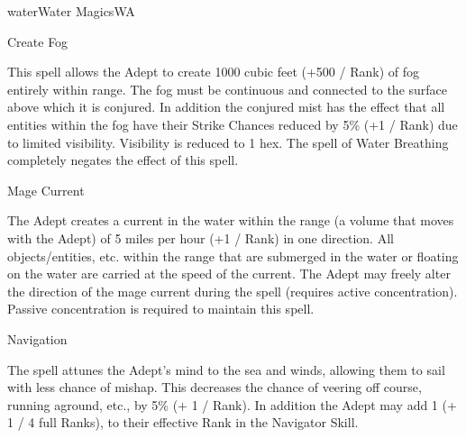 \begin{college}[1.3]{water}{Water Magics}{WA}
\begin{spell}[G-3]{Create Fog}

\begin{effects}
This spell allows the Adept to create 1000 cubic feet (+500 / Rank) of
fog entirely within range. The fog must be continuous and connected to
the surface above which it is conjured. In addition the conjured mist
has the effect that all entities within the fog have their Strike
Chances reduced by 5\% (+1 / Rank) due to limited visibility.
Visibility is reduced to 1 hex. The spell of Water Breathing
completely negates the effect of this spell.
\end{effects}
\end{spell}


\begin{spell}[G-4]{Mage Current}

\begin{effects}
The Adept creates a current in the water within the range (a volume
that moves with the Adept) of 5 miles per hour (+1 / Rank) in one
direction. All objects/entities, etc. within the range that are
submerged in the water or floating on the water are carried at the
speed of the current. The Adept may freely alter the direction of the
mage current during the spell (requires active concentration). Passive
concentration is required to maintain this spell.
\end{effects}
\end{spell}


\begin{spell}[G-5]{Navigation}

\begin{effects}
The spell attunes the Adept's mind to the sea and winds, allowing them
to sail with less chance of mishap. This decreases the chance of
veering off course, running aground, etc., by 5\% (+ 1 / Rank). In
addition the Adept may add 1 (+ 1 / 4 full Ranks), to their effective
Rank in the Navigator Skill.
\end{effects}
\end{spell}



\end{college}
